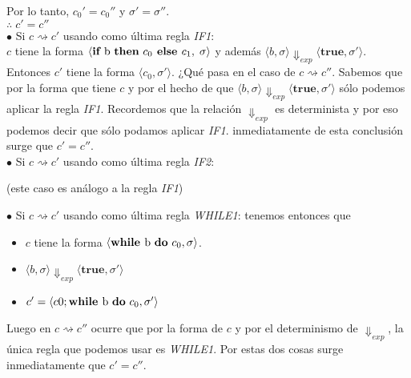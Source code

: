 \documentclass[11pt]{article}
\begin{document}
Por lo tanto, $c_0' = c_0''$ y $\sigma' = \sigma''$. \\

$\therefore \; c' = c''$ \\


$\bullet$ Si $ c \rightsquigarrow c' $ usando como última regla \emph{IF1}: \\
$c$ tiene la forma $ \langle \textbf{if } \text{b \textbf{then} } c_0 \textbf{ else } c_1, \; \sigma \rangle$
y además $ \langle b, \sigma \rangle \Downarrow_{exp} \langle \textbf{true}, \sigma' \rangle$.
Entonces $c'$ tiene la forma $ \langle c_0, \sigma' \rangle$. ¿Qué pasa en el caso
de  $ c \rightsquigarrow c'' $. Sabemos que por la forma que tiene $c$ y por el hecho de
que $ \langle b, \sigma \rangle \Downarrow_{exp} \langle \textbf{true}, \sigma' \rangle$
sólo podemos aplicar la regla \emph{IF1}. Recordemos que la relación $\Downarrow_{exp}$ es
determinista y por eso podemos decir que sólo podamos aplicar \emph{IF1}. inmediatamente
de esta conclusión surge que $c' = c''$. \\


$\bullet$ Si $ c \rightsquigarrow c' $ usando como última regla \emph{IF2}:
\begin{center}(este caso es análogo a la regla \emph{IF1})\end{center}


$\bullet$ Si $ c \rightsquigarrow c' $ usando como última regla \emph{WHILE1}: tenemos entonces que
\begin{itemize}
      \item $c$ tiene la forma $ \langle \textbf{while } \text{b \textbf{do} } c_0, \sigma \rangle$.
      \item $ \langle b, \sigma \rangle \Downarrow_{exp} \langle \textbf{true}, \sigma' \rangle$
      \item $c' = \langle c0; \textbf{while } \text{b \textbf{do} } c_0, \sigma' \rangle$
\end{itemize}

Luego en $ c \rightsquigarrow c'' $ ocurre que por la forma de $c$ y por el determinismo
de $\Downarrow_{exp}$, la única regla que podemos usar es \emph{WHILE1}. Por estas dos cosas
surge inmediatamente que $c' = c''$. \\
\end{document}
